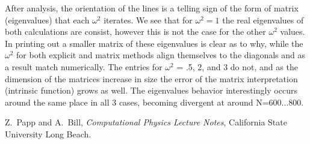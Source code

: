 \documentclass[12pt,letterpaper,notitlepage]{article}
\begin{document}
After analysis, the orientation of the lines is a telling sign of the form of matrix (eigenvalues) that each $\omega^2$ iterates. We see that for  $\omega^2= 1$ the real eigenvalues of both calculations are consist, however this is not the case for the other $\omega^2$ values. In printing out a smaller matrix of these eigenvalues is clear as to why, while the $\omega^2$ for both explicit and matrix methods align themselves to the diagonals and as a result match numerically. The entries for  $\omega^2$ = .5, 2, and 3 do not, and as the dimension of the matrices increase in size the error of the matrix interpretation (intrinsic function) grows as well. The eigenvalues behavior interestingly occurs around the same place in all 3 cases, becoming divergent at around N=600...800.

\begin{thebibliography}{}

	\bibitem{}
	Z.~Papp and A.~Bill, {\it Computational Physics Lecture Notes}, California State University Long Beach.
	
\end{thebibliography}
\end{document}
